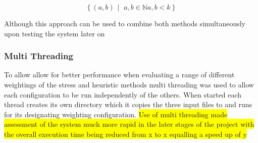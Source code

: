 \[ \left\{ (a, b) \,\middle|\, \, a,b \in \mathbb{N} a,b < k \right\} \]

Although this approach can be used to combine both methods simultaneously upon testing the system later on

\subsubsection{Multi Threading}
To allow allow for better performance when evaluating a range of different weightings of the stress and heuristic methods multi threading was used to allow each configuration to be run independently of the others. When started each thread creates its own directory which it copies the three input files to and runs for its designating weighting configuration. \colorbox{yellow}
{Use of multi threading made assessment of the system much more rapid in the later stages of the project with the overall execution time being reduced from x to x equalling a speed up of y}
